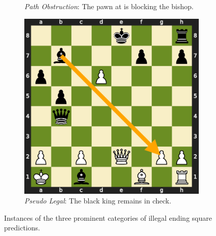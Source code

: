 \begin{figure}[t]
\begin{subfigure}{0.3\textwidth}
   \caption{\emph{Path Obstruction}: The pawn at  is blocking the bishop.} \label{fig:error_path}
\end{subfigure}
\hspace*{\fill}
\begin{subfigure}{0.3\textwidth}
   \includegraphics[width=\linewidth]{figures/board_pseudo.pdf}
   \caption{\emph{Pseudo Legal}: The black king remains in check.} \label{fig:error_pseudo}
\end{subfigure}
\caption{Instances of the three prominent categories of illegal ending square predictions.}
\label{fig:error_categories}
\end{figure}
